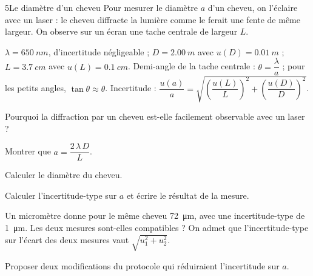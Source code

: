 \begin{exoBac}{5}{Le diamètre d'un cheveu}
Pour mesurer le diamètre $a$ d'un cheveu, on l'éclaire avec un laser : le cheveu diffracte la lumière comme le ferait une
fente de même largeur. On observe sur un écran une tache centrale de largeur $L$.
\begin{donnees}
$\lambda=\qty{650}{nm}$, d'incertitude négligeable ; $D=\qty{2,00}{m}$ avec $u(D)=\qty{0,01}{m}$ ; $L=\qty{3,7}{cm}$ avec $u(L)=\qty{0,1}{cm}$. Demi-angle
de la tache centrale : $\theta=\dfrac{\lambda}{a}$ ; pour les petits angles, $\tan\theta\approx\theta$. Incertitude :
$\dfrac{u(a)}{a}=\sqrt{\left(\dfrac{u(L)}{L}\right)^2+\left(\dfrac{u(D)}{D}\right)^2}$.
\end{donnees}
\begin{questions}
\item Pourquoi la diffraction par un cheveu est-elle facilement observable avec un laser ?
\item Montrer que $a=\dfrac{2\,\lambda\,D}{L}$.
\item Calculer le diamètre du cheveu.
\item Calculer l'incertitude-type sur $a$ et écrire le résultat de la mesure.
\item \initiative Un micromètre donne pour le même cheveu \qty{72}{\micro m}, avec une incertitude-type de \qty{1}{\micro m}. Les deux mesures
sont-elles compatibles ? On admet que l'incertitude-type sur l'écart des deux mesures vaut $\sqrt{u_1^2+u_2^2}$.
\item Proposer deux modifications du protocole qui réduiraient l'incertitude sur $a$.
\end{questions}
\end{exoBac}
